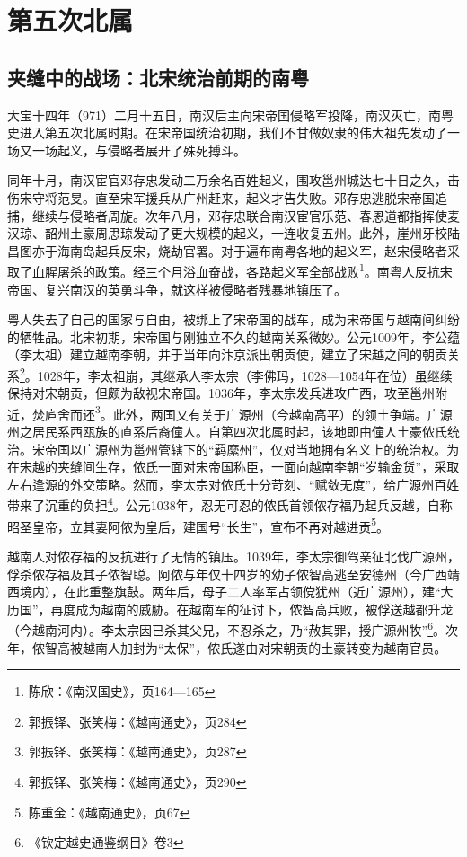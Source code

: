 \chapter{第五次北属}

\section{夹缝中的战场：北宋统治前期的南粤}

大宝十四年（971）二月十五日，南汉后主向宋帝国侵略军投降，南汉灭亡，南粤史进入第五次北属时期。在宋帝国统治初期，我们不甘做奴隶的伟大祖先发动了一场又一场起义，与侵略者展开了殊死搏斗。

同年十月，南汉宦官邓存忠发动二万余名百姓起义，围攻邕州城达七十日之久，击伤宋守将范旻。直至宋军援兵从广州赶来，起义才告失败。邓存忠逃脱宋帝国追捕，继续与侵略者周旋。次年八月，邓存忠联合南汉宦官乐范、春恩道都指挥使麦汉琼、韶州土豪周思琼发动了更大规模的起义，一连收复五州。此外，崖州牙校陆昌图亦于海南岛起兵反宋，烧劫官署。对于遍布南粤各地的起义军，赵宋侵略者采取了血腥屠杀的政策。经三个月浴血奋战，各路起义军全部战败\footnote{陈欣：《南汉国史》，页164—165}。南粤人反抗宋帝国、复兴南汉的英勇斗争，就这样被侵略者残暴地镇压了。

粤人失去了自己的国家与自由，被绑上了宋帝国的战车，成为宋帝国与越南间纠纷的牺牲品。北宋初期，宋帝国与刚独立不久的越南关系微妙。公元1009年，李公蕴（李太祖）建立越南李朝，并于当年向汴京派出朝贡使，建立了宋越之间的朝贡关系\footnote{郭振铎、张笑梅：《越南通史》，页284}。1028年，李太祖崩，其继承人李太宗（李佛玛，1028—1054年在位）虽继续保持对宋朝贡，但颇为敌视宋帝国。1036年，李太宗发兵进攻广西，攻至邕州附近，焚庐舍而还\footnote{郭振铎、张笑梅：《越南通史》，页287}。此外，两国又有关于广源州（今越南高平）的领土争端。广源州之居民系西瓯族的直系后裔僮人。自第四次北属时起，该地即由僮人土豪侬氏统治。宋帝国以广源州为邕州管辖下的“羁縻州”，仅对当地拥有名义上的统治权。为在宋越的夹缝间生存，侬氏一面对宋帝国称臣，一面向越南李朝“岁输金货”，采取左右逢源的外交策略。然而，李太宗对侬氏十分苛刻、“赋敛无度”，给广源州百姓带来了沉重的负担\footnote{郭振铎、张笑梅：《越南通史》，页290}。公元1038年，忍无可忍的侬氏首领侬存福乃起兵反越，自称昭圣皇帝，立其妻阿侬为皇后，建国号“长生”，宣布不再对越进贡\footnote{陈重金：《越南通史》，页67}。

越南人对侬存福的反抗进行了无情的镇压。1039年，李太宗御驾亲征北伐广源州，俘杀侬存福及其子侬智聪。阿侬与年仅十四岁的幼子侬智高逃至安德州（今广西靖西境内），在此重整旗鼓。两年后，母子二人率军占领傥犹州（近广源州），建“大历国”，再度成为越南的威胁。在越南军的征讨下，侬智高兵败，被俘送越都升龙（今越南河内）。李太宗因已杀其父兄，不忍杀之，乃“赦其罪，授广源州牧”\footnote{《钦定越史通鉴纲目》卷3}。次年，侬智高被越南人加封为“太保”，侬氏遂由对宋朝贡的土豪转变为越南官员。

